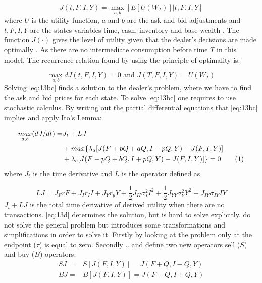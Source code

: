 \documentclass{kththesis}
\theoremstyle{definition}
\newcommand\numberthis{\addtocounter{equation}{1}\tag{\theequation}}
\begin{document}
\begin{equation}
    \label{eq:13a}
    J(t,F,I,Y) = \underset{a,b}{\max}[E[U(W_T)] | t,F,I,Y]
\end{equation}
where $U$ is the utility function, $a$ and $b$ are the ask and bid adjustments and $t, F, I,Y$ are the states variables time, cash, inventory and base wealth \parencite{o1995market}. The function $J(\cdot)$ gives the level of utility given that the dealer's decisions are made optimally \parencite{o1995market}. As there are no intermediate consumption before time $T$ in this model. The recurrence relation found by using the principle of optimality is:

\begin{equation}
    \label{eq:13bc}
    \underset{a,b}{\max}dJ(t,F,I,Y)=0 \text{ and } 
    J(T,F,I,Y)=U(W_T)
\end{equation}
Solving \autoref{eq:13bc} finds a solution to the dealer's problem, where we have to find the ask and bid prices for each state. To solve \autoref{eq:13bc} one requires to use stochastic calculus. By writing out the partial differential equations that \autoref{eq:13bc} implies and apply Ito's Lemma:

\begin{align*}
    \label{eq:13d}
    \underset{a,b}{max}(dJ/dt) = & J_t + LJ \\
    & + max\{\lambda_a[J(F+pQ+aQ, I-pQ,Y) - J(F,I,Y)] \\
    & + \lambda_b [J(F-pQ+bQ, I+pQ,Y) - J(F,I,Y)] \} = 0 \numberthis
\end{align*}
where $J_t$ is the time derivative and $L$ is the operator defined as

\begin{equation}
    LJ = J_{F}rF + J_{I}r_{I}I+J_{Y}r_{y}Y+\frac{1}{2}J_{II}\sigma^{2}_{I}I^{2}+ \frac{1}{2}J_{YY}\sigma^{2}_{Y}Y^{2} + J_{IY}\sigma_{IY}IY
\end{equation}
$J_t + LJ$ is the total time derivative of derived utility when there are no transactions. \autoref{eq:13d} determines the solution, but is hard to solve explicitly. \textcite{ho1981optimal} do not solve the general problem but introduces some transformations and simplifications in order to solve it. Firstly by looking at the problem only at the endpoint ($\tau$) is equal to zero. Secondly \parencite{o1995market} .. and define two new operators sell ($S$) and buy ($B$) operators:
\begin{align}
    \label{eq:13e}
    SJ = & S[J(F,I,Y)] = J(F+Q,I-Q, Y) \\
    BJ = & B[J(F,I,Y)] = J(F-Q, I+Q, Y)
\end{align}
\end{document}
